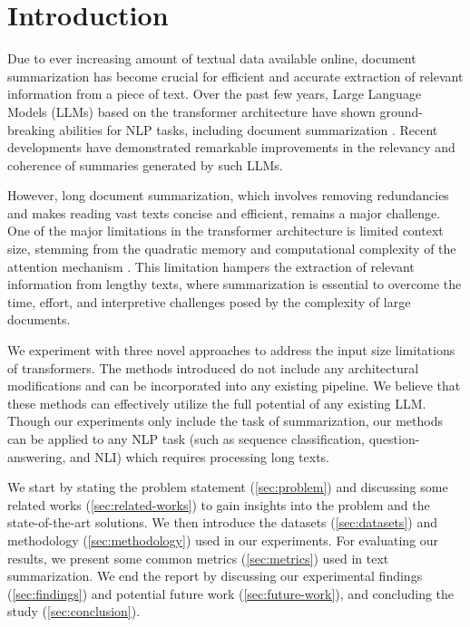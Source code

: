 \section{Introduction}
	\label{sec:introduction}

	Due to ever increasing amount of textual data available online, document summarization
	has become crucial for efficient and accurate extraction of relevant information from a
	piece of text.
	Over the past few years, Large Language Models (LLMs) based on the transformer architecture
	\cite{vaswani2017attention} have shown ground-breaking abilities for NLP tasks,
	including document summarization \cite{yadav2023state}.
	Recent developments have demonstrated remarkable improvements in the relevancy and
	coherence of summaries generated by such LLMs.

	However, long document summarization, which involves removing redundancies and makes reading
	vast texts concise and efficient, remains a major challenge.
	One of the major limitations in the transformer architecture is limited context size,
	stemming from the quadratic memory and computational complexity of the attention mechanism
	\cite{du2023improving}.
	This limitation hampers the extraction of relevant information from lengthy texts, where
	summarization is essential to overcome the time, effort, and interpretive challenges posed by
	the complexity of large documents.

	We experiment with three novel approaches to address the input size limitations of transformers.
	The methods introduced do not include any architectural modifications and can be incorporated
	into any existing pipeline.
	We believe that these methods can effectively utilize the full potential of any existing LLM.
	Though our experiments only include the task of summarization, our methods can be applied
	to any NLP task (such as sequence classification, question-answering, and NLI) which requires
	processing long texts.

	We start by stating the problem statement (\ref{sec:problem}) and discussing some related works
	(\ref{sec:related-works}) to gain insights into the problem and the state-of-the-art solutions.
	We then introduce the datasets (\ref{sec:datasets}) and methodology (\ref{sec:methodology}) used
	in our experiments.
	For evaluating our results, we present some common metrics (\ref{sec:metrics}) used in text
	summarization.
	We end the report by discussing our experimental findings (\ref{sec:findings}) and potential
	future work (\ref{sec:future-work}), and concluding the study (\ref{sec:conclusion}).
